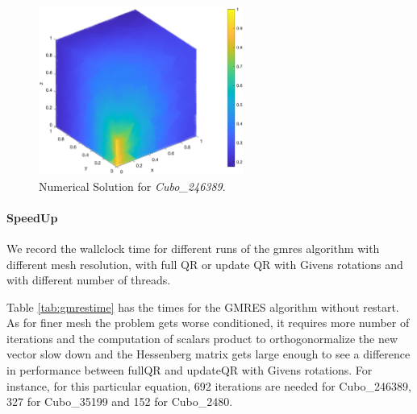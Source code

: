 \documentclass[hidelinks]{article}
\begin{document}
\begin{figure}[H]
    \centering
    \includegraphics[width= 0.6\textwidth]{pic/sol246389.eps}
    \caption{Numerical Solution for \emph{Cubo\_246389}.}\label{fig:numericalsol} 
\end{figure}

\paragraph{SpeedUp}
We record the wallclock time for different runs of the gmres algorithm with different mesh resolution, with full QR or update QR with Givens rotations and with different number of threads.

Table \ref{tab:gmrestime} has the times for the GMRES algorithm without restart. As for finer mesh the problem gets worse conditioned, it requires more number of iterations and the computation of scalars product to orthogonormalize the new vector slow down and the Hessenberg matrix gets large enough to see a difference in performance between fullQR and updateQR with Givens rotations. For instance, for this particular equation, 692 iterations are needed for Cubo\_246389, 327 for Cubo\_35199 and 152 for Cubo\_2480.
\end{document}
